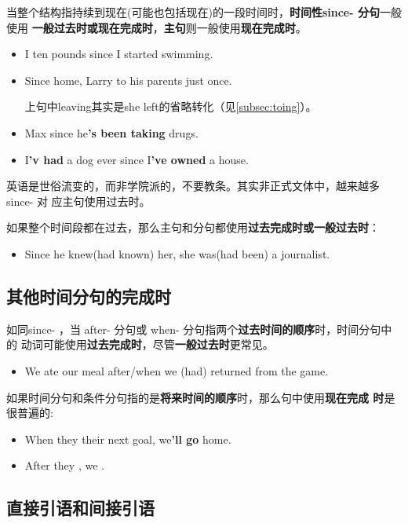 当整个结构指持续到现在(可能也包括现在)的一段时间时，\textbf{时间性since- 分句}一般使用
\textbf{一般过去时或现在完成时}，\textbf{主句}则一般使用\textbf{现在完成时}。

\begin{itemize}
\item I  ten pounds since I started swimming.
\item Since  home, Larry  to his parents just once.

  上句中leaving其实是she left的省略转化（见\cref{subsec:toing}）。

\item Max  since he\textbf{'s been taking} drugs.
\item I\textbf{'v had} a dog ever since I\textbf{'ve owned} a house.
\end{itemize}

英语是世俗流变的，而非学院派的，不要教条。其实非正式文体中，越来越多since- 对
应主句使用过去时。

如果整个时间段都在过去，那么主句和分句都使用\textbf{过去完成时或一般过去时}：
\begin{itemize}
\item Since he knew(had known) her, she was(had been) a journalist.
\end{itemize}

\subsection{其他时间分句的完成时}

如同since- ，当 after- 分句或 when- 分句指两个\textbf{过去时间的顺序}时，时间分句中的
动词可能使用\textbf{过去完成时}，尽管\textbf{一般过去时}更常见。
\begin{itemize}
\item We ate our meal after/when we (had) returned from the game.
\end{itemize}

如果时间分句和条件分句指的是\textbf{将来时间的顺序}时，那么句中使用\textbf{现在完成
  时}是很普遍的:
\begin{itemize}
\item When they their next goal, we\textbf{'ll go} home.

\item After they , we .
\end{itemize}


\subsection{直接引语和间接引语}


